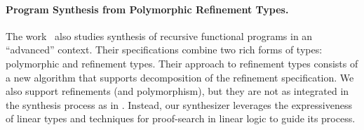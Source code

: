 \documentclass{llncs}
\newcommand{\mypara}[1]{\paragraph{\textbf{#1}.}}
\begin{document}

  
\mypara{Program Synthesis from Polymorphic Refinement Types} The
work~\cite{DBLP:conf/pldi/PolikarpovaKS16} also studies synthesis of recursive
functional programs in an ``advanced'' context. Their specifications combine two
rich forms of types: polymorphic and refinement types.
Their approach to
refinement types consists of a new algorithm that supports decomposition of the
refinement specification.
We also support refinements (and polymorphism),
but they are not as integrated in the synthesis process as in \cite{DBLP:conf/pldi/PolikarpovaKS16}.
Instead, our synthesizer leverages the expressiveness of linear
types and techniques for proof-search in linear logic to guide its process.
\end{document}
